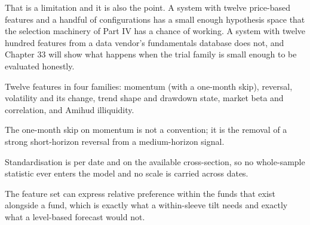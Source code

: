 That is a limitation and it is also the point. A system with twelve
price-based features and a handful of configurations has a small enough
hypothesis space that the selection machinery of Part IV has a chance of
working. A system with twelve hundred features from a data vendor's
fundamentals database does not, and Chapter 33 will show what happens when
the trial family is small enough to be evaluated honestly.

\begin{keytakeaways}
\item Twelve features in four families: momentum (with a one-month skip),
reversal, volatility and its change, trend shape and drawdown state,
market beta and correlation, and Amihud illiquidity.
\item The one-month skip on momentum is not a convention; it is the removal
of a strong short-horizon reversal from a medium-horizon signal.
\item Standardisation is per date and on the available cross-section, so no
whole-sample statistic ever enters the model and no scale is carried
across dates.
\item The feature set can express relative preference within the funds that
exist alongside a fund, which is exactly what a within-sleeve tilt needs
and exactly what a level-based forecast would not.
\end{keytakeaways}
